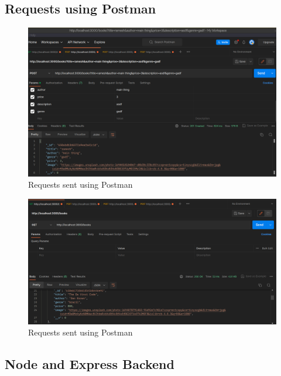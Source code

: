 \documentclass[11pt]{article}
\begin{document}
\subsection{Requests using Postman}

\begin{figure}[H]
    \centering
    \includegraphics[width=.95\textwidth]{Screenshots/postman 1.png}
    \caption{Requests sent using Postman}
\end{figure}

\begin{figure}[H]
    \centering
    \includegraphics[width=.95\textwidth]{Screenshots/postman 2.png}
    \caption{Requests sent using Postman}
\end{figure}


\subsection{Node and Express Backend}
\end{document}
